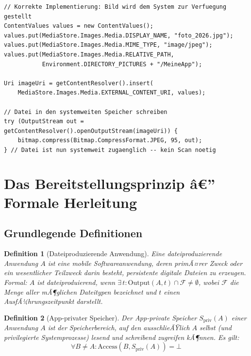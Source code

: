 ﻿\documentclass[12pt, a4paper]{article}
\newtheorem{definition}{Definition}[section]
\begin{document}
\begin{lstlisting}[style=android, caption={Korrekte Uebergabe eines Bildes an den MediaStore unter Android}]
// Korrekte Implementierung: Bild wird dem System zur Verfuegung gestellt
ContentValues values = new ContentValues();
values.put(MediaStore.Images.Media.DISPLAY_NAME, "foto_2026.jpg");
values.put(MediaStore.Images.Media.MIME_TYPE, "image/jpeg");
values.put(MediaStore.Images.Media.RELATIVE_PATH,
           Environment.DIRECTORY_PICTURES + "/MeineApp");

Uri imageUri = getContentResolver().insert(
    MediaStore.Images.Media.EXTERNAL_CONTENT_URI, values);

// Datei in den systemweiten Speicher schreiben
try (OutputStream out = getContentResolver().openOutputStream(imageUri)) {
    bitmap.compress(Bitmap.CompressFormat.JPEG, 95, out);
} // Datei ist nun systemweit zugaenglich -- kein Scan noetig
\end{lstlisting}

\section{Das Bereitstellungsprinzip â€” Formale Herleitung}
\label{sec:prinzip}

\subsection{Grundlegende Definitionen}

\begin{definition}[Dateiproduzierende Anwendung]
\label{def:dpapp}
Eine \emph{dateiproduzierende Anwendung} $A$ ist eine mobile Softwareanwendung, deren
primÃ¤rer Zweck oder ein wesentlicher Teilzweck darin besteht, persistente digitale
Dateien zu erzeugen. Formal: $A$ ist dateiproduierend, wenn $\exists\, t: \text{Output}(A, t) \cap \mathcal{F} \neq \emptyset$,
wobei $\mathcal{F}$ die Menge aller mÃ¶glichen Dateitypen bezeichnet und $t$ einen
AusfÃ¼hrungszeitpunkt darstellt.
\end{definition}

\begin{definition}[App-privater Speicher]
\label{def:privatspeicher}
Der \emph{App-private Speicher} $S_{\text{priv}}(A)$ einer Anwendung $A$ ist der
Speicherbereich, auf den ausschlieÃŸlich $A$ selbst (und privilegierte Systemprozesse)
lesend und schreibend zugreifen kÃ¶nnen. Es gilt:
\[
  \forall B \neq A: \text{Access}(B, S_{\text{priv}}(A)) = \bot
\]
\end{definition}
\end{document}
